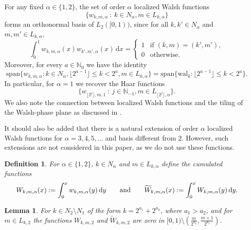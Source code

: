 \documentclass[namedate,webpdf,imanum]{ima-authoring-arxiv}%
\theoremstyle{thmstyletwo}%
\newtheorem{lemma}{Lemma}
\newtheorem{definition}{Definition}
\numberwithin{equation}{section}
\newcommand{\rd}{\, {\rm d}}
\begin{document}
For any fixed $\alpha \in \{1,2\}$, the set of order $\alpha$ localized Walsh functions
\begin{equation*}
\{w_{k,m,\alpha} \ : \ k \in N_\alpha, m \in L_{k,\alpha} \}
\end{equation*}
forms an orthonormal basis of $L_2([0,1))$, since for all $k, k' \in N_\alpha$ and $m, m' \in L_{k,\alpha}$,
\begin{equation*}
\int_0^1 w_{k,m,\alpha}(x) w_{k', m',\alpha}(x) \,\mathrm{d} x = \begin{cases} 1 & \mbox{if } (k,m) = (k', m'), \\ 0 & \mbox{otherwise}. \end{cases}
\end{equation*}
Moreover, for every $a \in \mathbb{N}_0$ we have the identity
\begin{equation*}
\mathrm{span}\{ w_{k, m,\alpha}: k \in N_\alpha,  \lfloor 2^{a-1} \rfloor \le k < 2^{a}, m \in L_{k,\alpha} \} = \mathrm{span}\{ \mathrm{wal}_k: \lfloor 2^{a-1} \rfloor \le k < 2^{a}\}.
\end{equation*}
In particular, for $\alpha = 1$ we recover the Haar functions
\begin{equation*}
\{w_{\lfloor 2^{j} \rfloor, m, 1} \ : \ j \in \mathbb{N}_{-1}, m \in L_{\lfloor 2^j \rfloor, \alpha}\}.
\end{equation*}
We also note the connection between localized Walsh functions and the tiling of the Walsh-phase plane as discussed in \cite{Thiele}. 

It should also be added that there is a natural extension of order $\alpha$ localized Walsh functions for $\alpha = 3, 4, 5, \ldots$ and basis different from $2$. However, such extensions are not considered in this paper, as we do not use these functions.

\begin{definition}
For $\alpha \in \{1,2\}$, $k \in N_\alpha$ and $m \in L_{k,\alpha}$ define the cumulated functions
\begin{equation*}
W_{k, m,\alpha}(x) := \int_0^x  w_{k, m,\alpha}(y) \rd y \qquad \mbox{and}\qquad 
\widetilde{W}_{k, m,\alpha}(x) := \int_0^x  W_{k, m,\alpha }(y) \rd y.
\end{equation*}
\end{definition}


\begin{lemma}\label{le:supp:W}
For $k \in N_2\setminus N_1$ of the form $k=2^{a_1}+2^{a_2}$, where $a_1>a_2$, and for $m \in L_{k,2}$ the functions $W_{k,m,2}$ and $\widetilde{W}_{k,m,2}$ are zero in $[0, 1) \setminus (\frac{m}{2^{a_2}},\frac{m+1}{2^{a_2}})$.  
\end{lemma}
\end{document}
